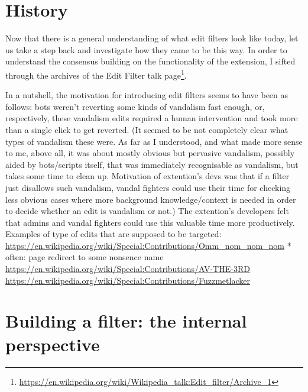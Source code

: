 

\section{History}

Now that there is a general understanding of what edit filters look like today, let us take a step back and investigate how they came to be this way.
In order to understand the consensus building on the functionality of the extension, I sifted through the archives of the Edit Filter talk page\footnote{\url{https://en.wikipedia.org/wiki/Wikipedia_talk:Edit_filter/Archive_1}}.

In a nutshell, the motivation for introducing edit filters seems to have been as follows:
bots weren't reverting some kinds of vandalism fast enough, or, respectively, these vandalism edits required a human intervention and took more than a single click to get reverted.
(It seemed to be not completely clear what types of vandalism these were.
As far as I understood, and what made more sense to me, above all, it was about mostly obvious but pervasive vandalism, possibly aided by bots/scripts itself, that was immediately recognisable as vandalism, but takes some time to clean up.
Motivation of extention's devs was that if a filter just disallows such vandalism, vandal fighters could use their time for checking less obvious cases where more background knowledge/context is needed in order to decide whether an edit is vandalism or not.)
The extention's developers felt that admins and vandal fighters could use this valuable time more productively.
Examples of type of edits that are supposed to be targeted:
\url{https://en.wikipedia.org/wiki/Special:Contributions/Omm_nom_nom_nom}
* often: page redirect to some nonsence name
\url{https://en.wikipedia.org/wiki/Special:Contributions/AV-THE-3RD}
\url{https://en.wikipedia.org/wiki/Special:Contributions/Fuzzmetlacker}


\section{Building a filter: the internal perspective}
